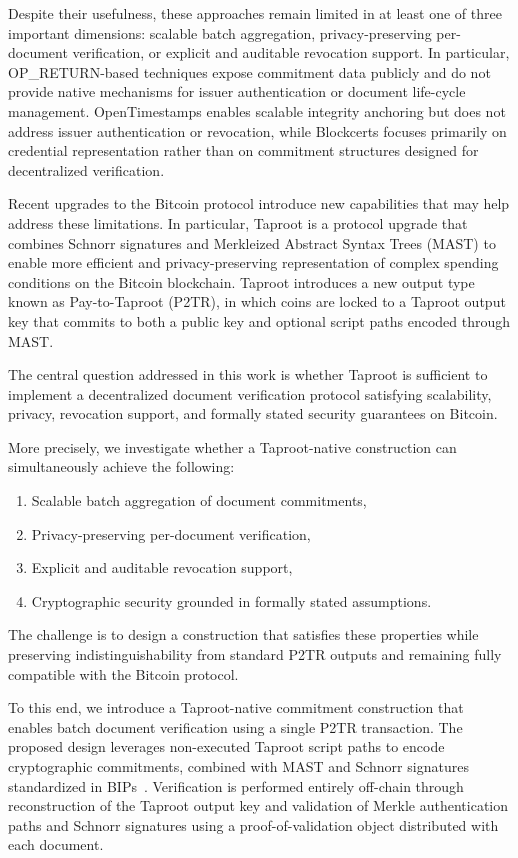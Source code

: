 \documentclass[preprint,12pt]{elsarticle}
\begin{document}
Despite their usefulness, these approaches remain limited in at least one of three important dimensions: scalable batch aggregation, privacy-preserving per-document verification, or explicit and auditable revocation support. 
In particular, OP\_RETURN-based techniques expose commitment data publicly and do not provide native mechanisms for issuer authentication or document life-cycle management. 
OpenTimestamps enables scalable integrity anchoring but does not address issuer authentication or revocation, while Blockcerts focuses primarily on credential representation rather than on commitment structures designed for decentralized verification.

Recent upgrades to the Bitcoin protocol introduce new capabilities that may help address these limitations. 
In particular, Taproot is a protocol upgrade that combines Schnorr signatures and Merkleized Abstract Syntax Trees (MAST) to enable more efficient and privacy-preserving representation of complex spending conditions on the Bitcoin blockchain.
Taproot introduces a new output type known as Pay-to-Taproot (P2TR), in which coins are locked to a Taproot output key that commits to both a public key and optional script paths encoded through MAST.

The central question addressed in this work is whether Taproot is sufficient to implement a decentralized document verification protocol satisfying scalability, privacy, revocation support, and formally stated security guarantees on Bitcoin.

More precisely, we investigate whether a Taproot-native construction can simultaneously achieve the following:

\begin{enumerate}
    \item Scalable batch aggregation of document commitments,
    \item Privacy-preserving per-document verification,
    \item Explicit and auditable revocation support,
    \item Cryptographic security grounded in formally stated assumptions.
\end{enumerate}

The challenge is to design a construction that satisfies these properties while preserving indistinguishability from standard P2TR outputs and remaining fully compatible with the Bitcoin protocol.

To this end, we introduce a Taproot-native commitment construction that enables batch document verification using a single P2TR transaction. 
The proposed design leverages non-executed Taproot script paths to encode cryptographic commitments, combined with MAST and Schnorr signatures standardized in BIPs~\cite{bip340,bip341}.
Verification is performed entirely off-chain through reconstruction of the Taproot output key and validation of Merkle authentication paths and Schnorr signatures using a proof-of-validation object distributed with each document.
\end{document}

